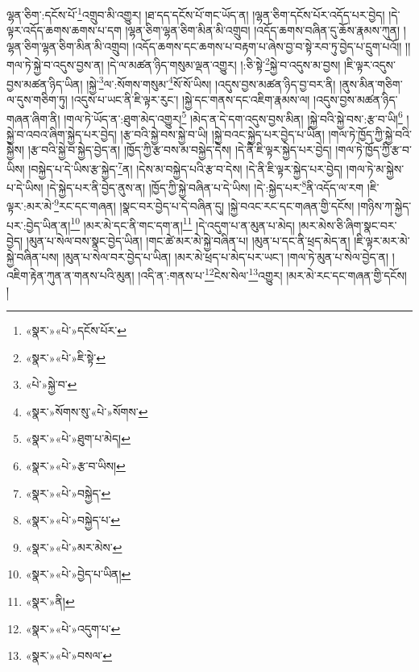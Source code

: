 ལྷན་ཅིག་:དངོས་པོ་\footnote{«སྣར་»«པེ་»དངོས་པོར་}འགྲུབ་མི་འགྱུར། །ཐ་དད་དངོས་པོ་གང་ཡོད་ན། །ལྷན་ཅིག་དངོས་པོར་འདོད་པར་བྱེད། །དེ་ལྟར་འདོད་ཆགས་ཆགས་པ་དག །ལྷན་ཅིག་ལྷན་ཅིག་མིན་མི་འགྲུབ། །འདོད་ཆགས་བཞིན་དུ་ཆོས་རྣམས་ཀུན། །ལྷན་ཅིག་ལྷན་ཅིག་མིན་མི་འགྲུབ། །འདོད་ཆགས་དང་ཆགས་པ་བརྟག་པ་ཞེས་བྱ་བ་སྟེ་རབ་ཏུ་བྱེད་པ་དྲུག་པའོ།། །།གལ་ཏེ་སྐྱེ་བ་འདུས་བྱས་ན། །དེ་ལ་མཚན་ཉིད་གསུམ་ལྡན་འགྱུར། །:ཅི་སྟེ་\footnote{«སྣར་»«པེ་»ཇི་སྟེ་}སྐྱེ་བ་འདུས་མ་བྱས། །ཇི་ལྟར་འདུས་བྱས་མཚན་ཉིད་ཡིན། །སྐྱེ་\footnote{«པེ་»སྐྱེ་བ་}ལ་:སོགས་གསུམ་\footnote{«སྣར་»སོགས་སུ་«པེ་»སོགས་}སོ་སོ་ཡིས། །འདུས་བྱས་མཚན་ཉིད་བྱ་བར་ནི། །ནུས་མིན་གཅིག་ལ་དུས་གཅིག་ཏུ། །འདུས་པ་ཡང་ནི་ཇི་ལྟར་རུང་། །སྐྱེ་དང་གནས་དང་འཇིག་རྣམས་ལ། །འདུས་བྱས་མཚན་ཉིད་གཞན་ཞིག་ནི། །གལ་ཏེ་ཡོད་ན་:ཐུག་མེད་འགྱུར།\footnote{«སྣར་»«པེ་»ཐུག་པ་མེད།} །མེད་ན་དེ་དག་འདུས་བྱས་མིན། །སྐྱེ་བའི་སྐྱེ་བས་:རྩ་བ་ཡི།\footnote{«སྣར་»«པེ་»རྩ་བ་ཡིས།} །སྐྱེ་བ་འབའ་ཞིག་སྐྱེད་པར་བྱེད། །རྩ་བའི་སྐྱེ་བས་སྐྱེ་བ་ཡི། །སྐྱེ་བའང་སྐྱེད་པར་བྱེད་པ་ཡིན། །གལ་ཏེ་ཁྱོད་ཀྱི་སྐྱེ་བའི་སྐྱེས། །རྩ་བའི་སྐྱེ་བ་སྐྱེད་བྱེད་ན། །ཁྱོད་ཀྱི་རྩ་བས་མ་བསྐྱེད་དེས། །དེ་ནི་ཇི་ལྟར་སྐྱེད་པར་བྱེད། །གལ་ཏེ་ཁྱོད་ཀྱི་རྩ་བ་ཡིས། །བསྐྱེད་པ་དེ་ཡིས་རྩ་སྐྱེད་\footnote{«སྣར་»«པེ་»བསྐྱེད་}ན། །དེས་མ་བསྐྱེད་པའི་རྩ་བ་དེས། །དེ་ནི་ཇི་ལྟར་སྐྱེད་པར་བྱེད། །གལ་ཏེ་མ་སྐྱེས་པ་དེ་ཡིས། །དེ་སྐྱེད་པར་ནི་བྱེད་ནུས་ན། །ཁྱོད་ཀྱི་སྐྱེ་བཞིན་པ་དེ་ཡིས། །དེ་:སྐྱེད་པར་\footnote{«སྣར་»«པེ་»བསྐྱེད་པ་}ནི་འདོད་ལ་རག །ཇི་ལྟར་:མར་མེ་\footnote{«སྣར་»«པེ་»མར་མེས་}རང་དང་གཞན། །སྣང་བར་བྱེད་པ་དེ་བཞིན་དུ། །སྐྱེ་བའང་རང་དང་གཞན་གྱི་དངོས། །གཉིས་ཀ་སྐྱེད་པར་:བྱེད་ཡིན་ན།\footnote{«སྣར་»«པེ་»བྱེད་པ་ཡིན།} །མར་མེ་དང་ནི་གང་དག་ན།\footnote{«སྣར་»ནི།} །དེ་འདུག་པ་ན་མུན་པ་མེད། །མར་མེས་ཅི་ཞིག་སྣང་བར་བྱེད། །མུན་པ་སེལ་བས་སྣང་བྱེད་ཡིན། །གང་ཚེ་མར་མེ་སྐྱེ་བཞིན་པ། །མུན་པ་དང་ནི་ཕྲད་མེད་ན། །ཇི་ལྟར་མར་མེ་སྐྱེ་བཞིན་པས། །མུན་པ་སེལ་བར་བྱེད་པ་ཡིན། །མར་མེ་ཕྲད་པ་མེད་པར་ཡང་། །གལ་ཏེ་མུན་པ་སེལ་བྱེད་ན། །འཇིག་རྟེན་ཀུན་ན་གནས་པའི་མུན། །འདི་ན་:གནས་པ་\footnote{«སྣར་»«པེ་»འདུག་པ་}ངེས་སེལ་\footnote{«སྣར་»«པེ་»བསལ་}འགྱུར། །མར་མེ་རང་དང་གཞན་གྱི་དངོས། །
